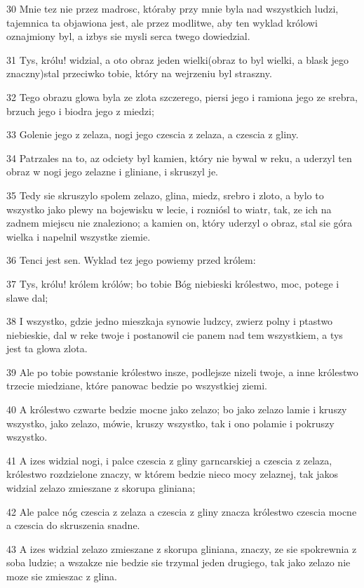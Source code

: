\par 30 Mnie tez nie przez madrosc, któraby przy mnie byla nad wszystkich ludzi, tajemnica ta objawiona jest, ale przez modlitwe, aby ten wyklad królowi oznajmiony byl, a izbys sie mysli serca twego dowiedzial.
\par 31 Tys, królu! widzial, a oto obraz jeden wielki(obraz to byl wielki, a blask jego znaczny)stal przeciwko tobie, który na wejrzeniu byl straszny.
\par 32 Tego obrazu glowa byla ze zlota szczerego, piersi jego i ramiona jego ze srebra, brzuch jego i biodra jego z miedzi;
\par 33 Golenie jego z zelaza, nogi jego czescia z zelaza, a czescia z gliny.
\par 34 Patrzales na to, az odciety byl kamien, który nie bywal w reku, a uderzyl ten obraz w nogi jego zelazne i gliniane, i skruszyl je.
\par 35 Tedy sie skruszylo spolem zelazo, glina, miedz, srebro i zloto, a bylo to wszystko jako plewy na bojewisku w lecie, i rozniósl to wiatr, tak, ze ich na zadnem miejscu nie znaleziono; a kamien on, który uderzyl o obraz, stal sie góra wielka i napelnil wszystke ziemie.
\par 36 Tenci jest sen. Wyklad tez jego powiemy przed królem:
\par 37 Tys, królu! królem królów; bo tobie Bóg niebieski królestwo, moc, potege i slawe dal;
\par 38 I wszystko, gdzie jedno mieszkaja synowie ludzcy, zwierz polny i ptastwo niebieskie, dal w reke twoje i postanowil cie panem nad tem wszystkiem, a tys jest ta glowa zlota.
\par 39 Ale po tobie powstanie królestwo insze, podlejsze nizeli twoje, a inne królestwo trzecie miedziane, które panowac bedzie po wszystkiej ziemi.
\par 40 A królestwo czwarte bedzie mocne jako zelazo; bo jako zelazo lamie i kruszy wszystko, jako zelazo, mówie, kruszy wszystko, tak i ono polamie i pokruszy wszystko.
\par 41 A izes widzial nogi, i palce czescia z gliny garncarskiej a czescia z zelaza, królestwo rozdzielone znaczy, w którem bedzie nieco mocy zelaznej, tak jakos widzial zelazo zmieszane z skorupa gliniana;
\par 42 Ale palce nóg czescia z zelaza a czescia z gliny znacza królestwo czescia mocne a czescia do skruszenia snadne.
\par 43 A izes widzial zelazo zmieszane z skorupa gliniana, znaczy, ze sie spokrewnia z soba ludzie; a wszakze nie bedzie sie trzymal jeden drugiego, tak jako zelazo nie moze sie zmieszac z glina.
